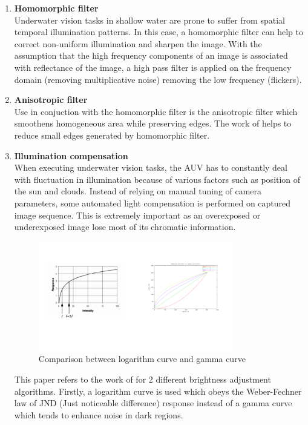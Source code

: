 \documentclass[fypca]{socreport}
\begin{document}
\begin{enumerate}

\item \textbf{Homomorphic filter} \\
Underwater vision tasks in shallow water are prone to suffer from spatial
temporal illumination patterns. In this case, a homomorphic filter can help to
correct non-uniform illumination and sharpen the image. With the assumption that
the high frequency components of an image is associated with reflectance of the
image, a high pass filter is applied on the frequency domain (removing
multiplicative noise) removing the low frequency (flickers).

\item \textbf{Anisotropic filter} \\
Use in conjuction with the homomorphic filter is the anisotropic filter which
smoothens homogeneous area while preserving edges. The work of
 helps to reduce small edges generated by homomorphic filter.

\item \textbf{Illumination compensation} \\
When executing underwater vision tasks, the AUV has to constantly deal with
fluctuation in illumination because of various factors such as position of the
sun and clouds. Instead of relying on manual tuning of camera parameters, some
automated light compensation is performed on captured image sequence. This is
extremely important as an overexposed or underexposed image lose most of its
chromatic information.

\begin{figure}[H]
\centering
  \includegraphics[width=0.8\textwidth, height=0.3\textheight]{lightcompensation.png}
  \caption{Comparison between logarithm curve and gamma curve}
  \label{fig:light_compensation}
\end{figure}

This paper refers to the work of  for 2 different
brightness adjustment algorithms. Firstly, a logarithm curve is used which obeys
the Weber-Fechner law of JND (Just noticeable difference) response instead of a
gamma curve which tends to enhance noise in dark regions.

\end{enumerate}
\end{document}

